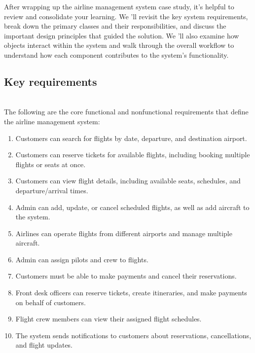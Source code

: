 

After wrapping up the airline management system case study, it's helpful to review and consolidate your learning. We 'll revisit the key system requirements, break down the primary classes and their responsibilities, and discuss the important design principles that guided the solution. We
'll also examine how objects interact within the system and walk through the overall workflow to understand how each component contributes to the system's functionality.

\subsection{Key requirements}\label{6YtmoXxRqTE45DcZ2Y_JP}
\\
The following are the core functional and nonfunctional requirements that define the airline management system:

\begin{enumerate}
\item
\protect{}\label{c2KqvQ6gzbdelCr4jFZ4D}
Customers can search for flights by date, departure, and destination airport.
\item
\protect{}\label{pi5HKgc-LOkVGYDN72WKE}
Customers can reserve tickets for available flights, including booking multiple flights or seats at once.
\item
Customers can view flight details, including available seats, schedules, and departure/arrival times.
\item
Admin can add, update, or cancel scheduled flights, as well as add aircraft to the system.
\item
\protect{}\label{oIDjWkhYql3G-RWITbofT}
Airlines can operate flights from different airports and manage multiple aircraft.
\item
\protect{}\label{kayUcwi1UaB5Vw5TF9Ao2}
Admin can assign pilots and crew to flights.
\item
\protect{}\label{7q9l0ecJPUU9KFtiIlcBg}
Customers must be able to make payments and cancel their reservations.
\item
\protect{}\label{ceJ5v1BhBJ3J0tzqhSyho}
Front desk officers can reserve tickets, create itineraries, and make payments on behalf of customers.
\item
\protect{}\label{ihwb25wHiKstwdlpIzQbt}
Flight crew members can view their assigned flight schedules.
\item
\protect{}\label{GbIr74bCtWx5EjIrjkYFt}
The system sends notifications to customers about reservations, cancellations, and flight updates.
\end{enumerate}


